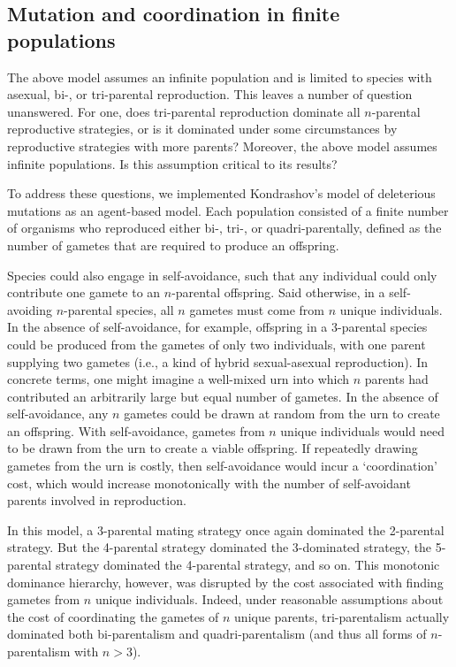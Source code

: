 \documentclass{report}
\begin{document}
\subsection*{Mutation and coordination in finite populations}
The above model assumes an infinite population and is limited to species with asexual, bi-, or tri-parental reproduction. This leaves a number of question unanswered. For one, does tri-parental reproduction dominate all $n$-parental reproductive strategies, or is it dominated under some circumstances by reproductive strategies with more parents? Moreover, the above model assumes infinite populations. Is this assumption critical to its results?

To address these questions, we implemented Kondrashov's model of deleterious mutations as an agent-based model. Each population consisted of a finite number of organisms who reproduced either bi-, tri-, or quadri-parentally, defined as the number of gametes that are required to produce an offspring. 

Species could also engage in self-avoidance, such that any individual could only contribute one gamete to an $n$-parental offspring. Said otherwise, in a self-avoiding $n$-parental species, all $n$ gametes must come from $n$ unique individuals. In the absence of self-avoidance, for example, offspring in a $3$-parental species could be produced from the gametes of only two individuals, with one parent supplying two gametes (i.e., a kind of hybrid sexual-asexual reproduction). In concrete terms, one might imagine a well-mixed urn into which $n$ parents had contributed an arbitrarily large but equal number of gametes. In the absence of self-avoidance, any $n$ gametes could be drawn at random from the urn to create an offspring. With self-avoidance, gametes from $n$ unique individuals would need to be drawn from the urn to create a viable offspring. If repeatedly drawing gametes from the urn is costly, then self-avoidance would incur a `coordination' cost, which would increase monotonically with the number of self-avoidant parents involved in reproduction.

In this model, a 3-parental mating strategy once again dominated the 2-parental strategy. But the 4-parental strategy dominated the 3-dominated strategy, the 5-parental strategy dominated the 4-parental strategy, and so on. This monotonic dominance hierarchy, however, was disrupted by the cost associated with finding gametes from $n$ unique individuals. Indeed, under reasonable assumptions about the cost of coordinating the gametes of $n$ unique parents, tri-parentalism actually dominated both bi-parentalism and quadri-parentalism (and thus all forms of $n$-parentalism with $n>3$). 
\end{document}
